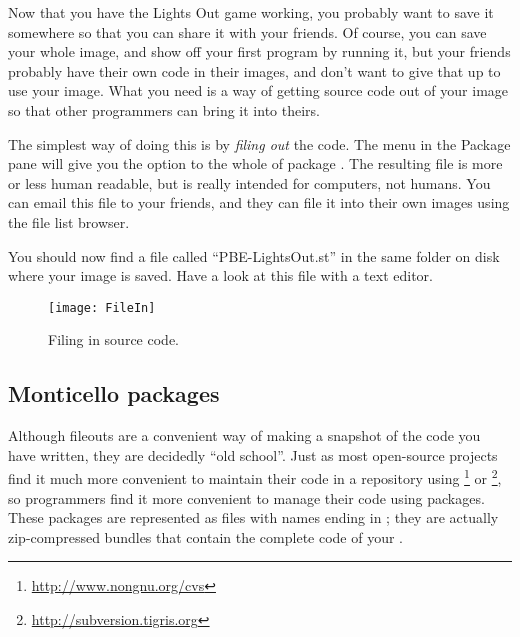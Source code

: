 \documentclass[a4paper,10pt,twoside]{book}
\begin{document}
{Now that you have the Lights Out game working, you probably want to save it somewhere so that you can share it with your friends. Of course, you can save your whole \pharo image, and show off your first program by running it, but your friends probably have their own code in their images, and don't want to give that up to use your image.
What you need is a way of getting source code out of your \pharo image so that other programmers can bring it into theirs.

The simplest way of doing this is by \emph{filing out} the code.  The \actclick menu in the Package pane will give you the option to  the whole of package .
The resulting file is more or less human readable, but is really intended for computers, not humans.
You can email this file to your friends, and they can file it into their own \pharo images using the file list browser.

You should now find a file called ``PBE-LightsOut.st'' in the same folder on disk where your image is saved.
Have a look at this file with a text editor.


\begin{figure}[ht]
\centerline {\texttt{[image: FileIn]}}
\caption{Filing in \pharo source code.
}
\end{figure}

\subsection{Monticello packages}
Although fileouts are a convenient way of making a snapshot of the code you have written, they are decidedly ``old school''.
Just as most open-source projects find it much more convenient to maintain their code in a repository using \footnote{\url{http://www.nongnu.org/cvs}} or \footnote{\url{http://subversion.tigris.org}},
so \pharo programmers find it more convenient to manage their code using  packages. 
These packages are represented as files with names ending in ; they are actually zip-compressed bundles that contain the complete code of your .

}
\end{document}
